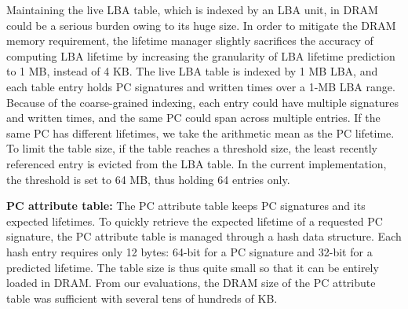 Maintaining the live LBA table, which is indexed by an LBA unit,
in DRAM could be a serious burden owing to its
huge size. In order to mitigate the DRAM memory requirement, 
the lifetime manager slightly sacrifices
the accuracy of computing LBA lifetime by increasing the 
granularity of LBA lifetime prediction to 1 MB, instead of 4 KB.  The
live LBA table is indexed by 1 MB LBA, and each table entry holds PC
signatures and written times over a 1-MB LBA range. 
Because of the coarse-grained indexing, each entry
could have multiple signatures and written times, and the same PC could span
across multiple entries.  If the same PC has different lifetimes, we take the
arithmetic mean as the PC lifetime. 
To limit the table size, if the table reaches a
threshold size, the least recently referenced entry is evicted from 
the LBA table.
In the current implementation, the threshold is set to 64 MB, thus 
holding 64 entries only.

\textbf{PC attribute table:}
The PC attribute table keeps PC signatures and its expected lifetimes. To quickly
retrieve the expected lifetime of a requested PC signature, 
the PC attribute table is managed
through a hash data structure. Each hash entry requires only 12 bytes: 64-bit
for a PC signature and 32-bit for a predicted lifetime.  The table size is thus
quite small so that it can be entirely loaded in DRAM. 
From our evaluations, the DRAM size of the PC attribute table was sufficient 
with several tens of hundreds of KB.


